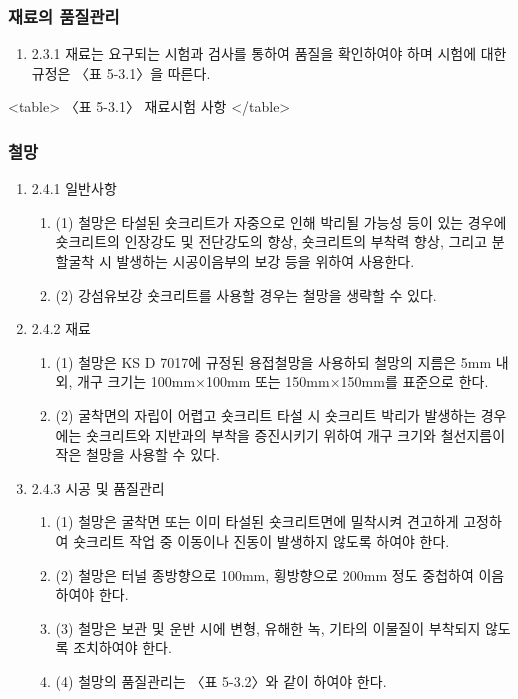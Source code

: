 \subsubsection{재료의 품질관리}
\begin{enumerate}
\item  2.3.1 재료는 요구되는 시험과 검사를 통하여 품질을 확인하여야 하며 시험에 대한 규정은 〈표 5-3.1〉을 따른다.  
\end{enumerate}

<table>
〈표 5-3.1〉 재료시험 사항
</table>

\subsubsection{철망}
\begin{enumerate}
\item 2.4.1 일반사항  
\begin{enumerate}
\item (1) 철망은 타설된 숏크리트가 자중으로 인해 박리될 가능성 등이 있는 경우에 숏크리트의 인장강도 및 전단강도의 향상, 숏크리트의 부착력 향상, 그리고 분할굴착 시 발생하는 시공이음부의 보강 등을 위하여 사용한다. 
\item (2) 강섬유보강 숏크리트를 사용할 경우는 철망을 생략할 수 있다. 
\end{enumerate}
\item 2.4.2 재료  
\begin{enumerate}
\item (1) 철망은 KS D 7017에 규정된 용접철망을 사용하되 철망의 지름은 5mm 내외, 개구 크기는 100mm×100mm 또는 150mm×150mm를 표준으로 한다.  
\item (2) 굴착면의 자립이 어렵고 숏크리트 타설 시 숏크리트 박리가 발생하는 경우에는 숏크리트와 지반과의 부착을 증진시키기 위하여 개구 크기와 철선지름이 작은 철망을 사용할 수 있다. 
\end{enumerate}
\item 2.4.3 시공 및 품질관리  
	\begin{enumerate}
	\item (1) 철망은 굴착면 또는 이미 타설된 숏크리트면에 밀착시켜 견고하게 고정하여 숏크리트 작업 중 이동이나 진동이 발생하지 않도록 하여야 한다. 
	\item (2) 철망은 터널 종방향으로 100mm, 횡방향으로 200mm 정도 중첩하여 이음하여야 한다. 
	\item (3) 철망은 보관 및 운반 시에 변형, 유해한 녹, 기타의 이물질이 부착되지 않도록 조치하여야 한다. 
	\item (4) 철망의 품질관리는 〈표 5-3.2〉와 같이 하여야 한다. 
	\end{enumerate}
\end{enumerate}
 
